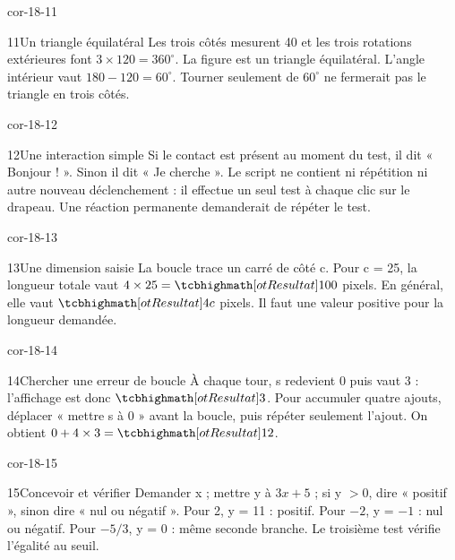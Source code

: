 \begin{blocLivre}{cor-18-11}\begin{corrige}{11}{Un triangle équilatéral}
Les trois côtés mesurent 40 et les trois rotations extérieures font $3\times120=360^\circ$. La figure est un triangle équilatéral. L’angle intérieur vaut $180-120=60^\circ$. Tourner seulement de $60^\circ$ ne fermerait pas le triangle en trois côtés.
\label{fig-cor-18-11}
\end{corrige}\end{blocLivre}
\begin{blocLivre}{cor-18-12}\begin{corrige}{12}{Une interaction simple}
Si le contact est présent au moment du test, il dit « Bonjour ! ». Sinon il dit « Je cherche ». Le script ne contient ni répétition ni autre nouveau déclenchement : il effectue un seul test à chaque clic sur le drapeau. Une réaction permanente demanderait de répéter le test.
\label{fig-cor-18-12}
\end{corrige}\end{blocLivre}
\begin{blocLivre}{cor-18-13}\begin{corrige}{13}{Une dimension saisie}
La boucle trace un carré de côté c. Pour c = 25, la longueur totale vaut $4\times25=\res{100}$ pixels. En général, elle vaut $\res{4c}$ pixels. Il faut une valeur positive pour la longueur demandée.
\label{fig-cor-18-13}
\end{corrige}\end{blocLivre}
\begin{blocLivre}{cor-18-14}\begin{corrige}{14}{Chercher une erreur de boucle}
À chaque tour, s redevient 0 puis vaut 3 : l’affichage est donc $\res3$. Pour accumuler quatre ajouts, déplacer « mettre s à 0 » avant la boucle, puis répéter seulement l’ajout. On obtient $0+4\times3=\res{12}$.
\label{fig-cor-18-14}
\end{corrige}\end{blocLivre}
\begin{blocLivre}{cor-18-15}\begin{corrige}{15}{Concevoir et vérifier}
Demander x ; mettre y à $3x+5$ ; si y $>0$, dire « positif », sinon dire « nul ou négatif ». Pour 2, y = 11 : positif. Pour $-2$, y = $-1$ : nul ou négatif. Pour $-5/3$, y = 0 : même seconde branche. Le troisième test vérifie l’égalité au seuil.
\label{fig-cor-18-15}
\end{corrige}\end{blocLivre}

